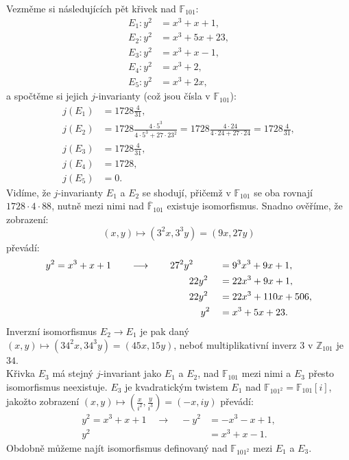 \documentclass [12pt]{report}
\begin{document}
\begin{priklad}
Vezměme si následujících pět křivek nad $\mathbb{F}_{101}$:
\begin{align*}
E_1 : y^2 &= x^3+x+1,\\
E_2 : y^2 &= x^3+5x+23,\\
E_3 : y^2 &= x^3+x-1,\\
E_4 : y^2 &= x^3+2,\\
E_5 : y^2 &= x^3+2x,
\end{align*}
a spočtěme si jejich $j$-invarianty (což jsou čísla v $\mathbb{F}_{101}$):
\begin{align*}
j(E_1) &= 1728 \frac{4}{31},\\
j(E_2) &= 1728 \frac{4 \cdot 5^3}{4 \cdot 5^3+27 \cdot 23^2} = 1728 \frac{4 \cdot 24}{4 \cdot 24 + 27 \cdot 24} = 1728 \frac{4}{31},\\
j(E_3) &= 1728 \frac{4}{31},\\
j(E_4) &= 1728,\\
j(E_5) &= 0.
\end{align*}
Vidíme, že $j$-invarianty $E_1$ a $E_2$ se shodují, přičemž v $\mathbb{F}_{101}$ se oba rovnají $1728 \cdot 4 \cdot 88$, nutně mezi nimi nad $\overline{\mathbb{F}}_{101}$ existuje isomorfismus. Snadno ověříme, že zobrazení:
\begin{equation*}
(x,y) \longmapsto (3^2 x, 3^3 y) = (9x,27y) 
\end{equation*}
převádí:
\begin{alignat*}{3}
y^2 &= x^3+x+1 \qquad \longrightarrow \qquad 27^2 y^2&&= 9^3 x^3 + 9x + 1,\\
&\qquad \hspace*{4.225cm}  22y^2&&= 22 x^3 + 9x + 1,\\
&\qquad \hspace*{4.225cm} 22y^2&&= 22 x^3 + 110x + 506,\\
&\qquad \hspace*{4.65cm} y^2&&= x^3 + 5x + 23.
\end{alignat*}
Inverzní isomorfismus $E_2 \longrightarrow E_1$ je pak daný $(x,y) \mapsto (34^2 x, 34^3 y) = (45x,15y)$, neboť multiplikativní inverz $3$ v $\mathbb{Z}_{101}$ je $34$.\\

Křivka $E_3$ má stejný $j$-invariant jako $E_1$ a $E_2$, nad $\mathbb{F}_{101}$ mezi nimi a $E_3$ přesto isomorfismus neexistuje. $E_3$ je kvadratickým twistem $E_1$ nad $\mathbb{F}_{101^2} = \mathbb{F}_{101}[i]$, jakožto zobrazení $(x,y) \mapsto \left(\frac{x}{i^2}, \frac{y}{i^3}\right) = (-x,iy)$ převádí:
\begin{align*}
y^2 = x^3+x+1 \quad \longrightarrow \quad -y^2 &= -x^3-x+1,\\
 y^2 &=  x^3 + x - 1.
\end{align*}
Obdobně můžeme najít isomorfismus definovaný nad $\mathbb{F}_{101^2}$ mezi $E_1$ a $E_3$.\end{priklad}
\end{document}
